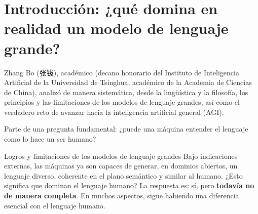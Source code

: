 \section{Introducción: ¿qué domina en realidad un modelo de lenguaje grande?}

Zhang Bo (张钹), académico (decano honorario del Instituto de Inteligencia Artificial de la Universidad de Tsinghua, académico de la Academia de Ciencias de China), analizó de manera sistemática, desde la lingüística y la filosofía, los principios y las limitaciones de los modelos de lenguaje grandes, así como el verdadero reto de avanzar hacia la inteligencia artificial general (AGI).

Parte de una pregunta fundamental: ¿puede una máquina entender el lenguaje como lo hace un ser humano?

\begin{importantbox}{Logros y limitaciones de los modelos de lenguaje grandes}
Bajo indicaciones externas, las máquinas ya son capaces de generar, en dominios abiertos, un lenguaje diverso, coherente en el plano semántico y similar al humano. ¿Esto significa que dominan el lenguaje humano? La respuesta es: sí, pero \textbf{todavía no de manera completa}. En muchos aspectos, sigue habiendo una diferencia esencial con el lenguaje humano.
\end{importantbox}


